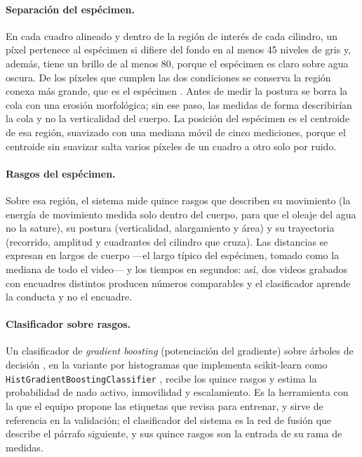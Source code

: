 \paragraph{Separación del espécimen.} En cada cuadro alineado y dentro de la
región de interés de cada cilindro, un píxel pertenece al espécimen si difiere del
fondo en al menos 45 niveles de gris y, además, tiene un brillo de al menos 80, porque
el espécimen es claro sobre agua oscura. De los píxeles que cumplen las dos
condiciones se conserva la región conexa más grande, que es el espécimen
\cite{bradski2008}. Antes de medir la postura se borra la cola con una erosión
morfológica; sin ese paso, las medidas de forma describirían la cola y no la
verticalidad del cuerpo. La posición del espécimen es el centroide de esa región,
suavizado con una mediana móvil de cinco mediciones, porque el centroide sin
suavizar salta varios píxeles de un cuadro a otro solo por ruido.

\paragraph{Rasgos del espécimen.} Sobre esa región, el sistema mide quince rasgos que describen su movimiento (la
energía de movimiento medida solo dentro del cuerpo, para que el oleaje del agua no
la sature), su postura (verticalidad, alargamiento y área) y su trayectoria
(recorrido, amplitud y cuadrantes del cilindro que cruza). Las distancias se
expresan en largos de cuerpo ---el largo típico del espécimen, tomado como la
mediana de todo el video--- y los tiempos en segundos: así, dos videos grabados
con encuadres distintos producen números comparables y el clasificador aprende la
conducta y no el encuadre.

\paragraph{Clasificador sobre rasgos.} Un clasificador de \textit{gradient
boosting} (potenciación del gradiente) sobre árboles de decisión
\cite{friedman2001}, en la variante por histogramas que implementa scikit-learn
como \texttt{HistGradientBoostingClassifier} \cite{pedregosa2011,ke2017}, recibe
los quince rasgos y estima la probabilidad de nado activo, inmovilidad y
escalamiento. Es la herramienta con la que el equipo propone las etiquetas que revisa para entrenar, y sirve de referencia en la validación; el clasificador del sistema es la red de fusión que describe el párrafo siguiente, y sus quince rasgos son la entrada de su rama de medidas.

